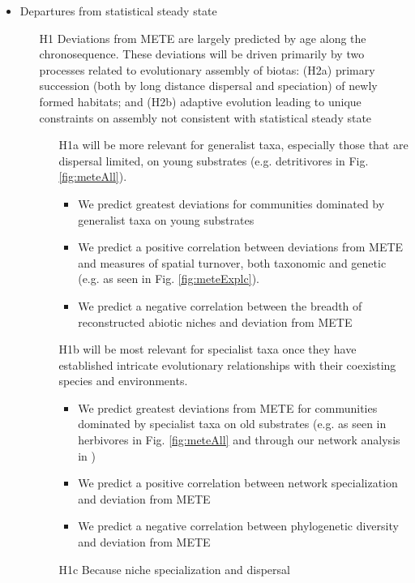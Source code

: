 \documentclass[11pt]{article}
\begin{document}
\begin{itemize}
\item Departures from statistical steady state
  \begin{itemize}
  \item[H1] Deviations from METE are largely predicted by age along
    the chronosequence. These deviations will be driven primarily by
    two processes related to evolutionary assembly of biotas: (H2a)
    primary succession (both by long distance dispersal and
    speciation) of newly formed habitats; and (H2b) adaptive evolution
    leading to unique constraints on assembly not consistent with
    statistical steady state
    \begin{itemize}
    \item[H1a] will be more relevant for generalist taxa, especially
      those that are dispersal limited, on young substrates
      (e.g. detritivores in Fig. \ref{fig:meteAll}).
      \begin{itemize}
      \item We predict greatest deviations for communities
        dominated by generalist taxa on young substrates
      \item We predict a positive correlation between deviations
        from METE and measures of spatial turnover, both taxonomic
        and genetic (e.g. as seen in Fig. \ref{fig:meteExplc}).
      \item We predict a negative correlation between the breadth
        of reconstructed abiotic niches and deviation from METE
      \end{itemize}
    \item[H1b] will be most relevant for specialist taxa once they
      have established intricate evolutionary relationships with
      their coexisting species and environments.
      \begin{itemize}
      \item We predict greatest deviations from METE for communities
        dominated by specialist taxa on old substrates (e.g. as seen
        in herbivores in Fig. \ref{fig:meteAll} and through our
        network analysis in \citet{rominger2015})
      \item We predict a positive correlation between network
        specialization and deviation from METE
      \item We predict a negative correlation between phylogenetic
        diversity and deviation from METE
      \end{itemize}
    \item[H1c]  Because niche specialization and dispersal

\end{itemize}
\end{itemize}
\end{itemize}
\end{document}
